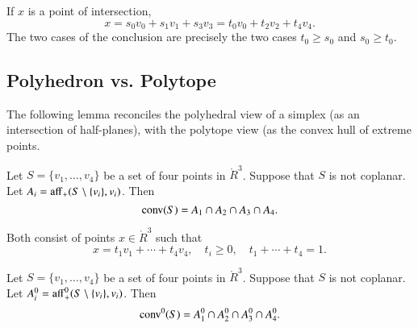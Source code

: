 \begin{tarskidata}
\begin{tarski}
\begin{proved} 
If $x$ is a point of intersection,
  $$
  x = s_0 v_0 + s_1 v_1 + s_3 v_ 3 = t_0 v_0 + t_2 v_2 + t_4 v_4.
  $$
The two cases of the conclusion are precisely the two cases
  $t_0\ge s_0$ and $s_0\ge t_0$.
\swallowed\end{proved}
\end{tarski}





\begin{tarski}
\section{Polyhedron vs. Polytope}
The following lemma reconciles the polyhedral view of a simplex
(as an intersection of half-planes), with the polytope view (as
the convex hull of extreme points.


\begin{lemma} 
Let $S=\{v_1,\ldots, v_4\}$ be a set of four points
in $\ring{R}^3$.  Suppose that $S$ is not coplanar.
Let $A_i = {\operatorname{aff}}_+(S\setminus\{v_i\},v_i)$.
Then $${\operatorname{conv}}(S)  = A_1\cap A_2\cap A_3\cap A_4.$$
%
\end{lemma}

\begin{proved}
Both consist of points $x\in\ring{R}^3$ such that
  $$x = t_1 v_1 +\cdots+ t_4 v_4,\quad t_i\ge 0,\quad t_1+\cdots +t_4 =1.
  $$
\swallowed\end{proved}
\end{tarski}



\begin{tarski}

\begin{lemma}
Let $S=\{v_1,\ldots, v_4\}$ be a set of four points
in $\ring{R}^3$.  Suppose that $S$ is not coplanar.
Let $A^0_i = {\operatorname{aff}}^0_+(S\setminus\{v_i\},v_i)$.
Then $${\operatorname{conv}}^0(S)  = A^0_1 \cap A^0_2 \cap A^0_3 \cap A^0_4.$$
\end{lemma}


\end{tarski}
\end{tarskidata}
